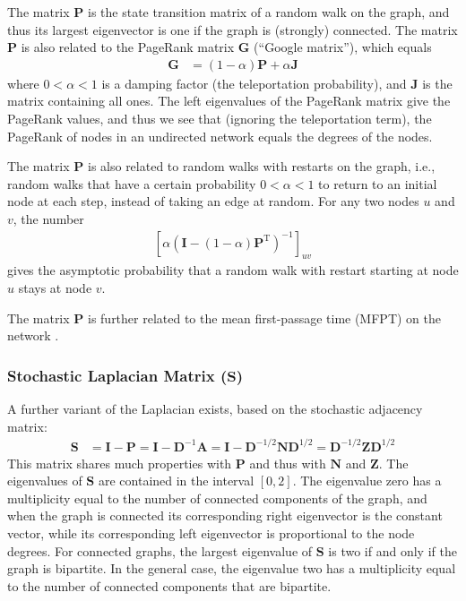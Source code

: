 \documentclass{article}
\begin{document}
The matrix $\mathbf P$ is the state transition matrix of a random walk
on the graph, and thus its largest eigenvector is one if the graph is
(strongly) connected.  
The matrix $\mathbf P$ is also related to the PageRank matrix $\mathbf
G$ (``Google matrix''), which
equals 
\begin{align*}
  \mathbf G &= (1-\alpha) \mathbf P + \alpha\mathbf J
\end{align*}
where $0 < \alpha < 1$ is a damping factor (the teleportation
probability), and $\mathbf J$ is the matrix containing all ones.  The
left 
eigenvalues of the PageRank matrix give the PageRank values, and thus
we see that (ignoring the teleportation term), the PageRank of nodes in
an undirected network equals the degrees of the nodes. 

The matrix $\mathbf P$ is also related to random walks with restarts on
the graph, i.e., random walks that have a certain probability $0 <
\alpha < 1$
to return to an initial node at each step, instead of taking an edge at
random.  For any two nodes $u$ and $v$, the number
\begin{align}
  \left[\alpha  (\mathbf I - (1-\alpha) \mathbf P^{\mathrm T})^{-1}\right]_{uv}
\end{align}
gives the asymptotic probability that a random walk with restart starting at node $u$
stays at node $v$.  

The matrix $\mathbf P$ is further related to the mean first-passage time
(MFPT) on the network \citep{b880}.

\subsubsection{Stochastic Laplacian Matrix ($\mathbf S$)}
A further variant of the Laplacian exists, based on the stochastic
adjacency matrix:
\begin{align*}
  \mathbf S &= \mathbf I - \mathbf P = \mathbf I - \mathbf D^{-1}
  \mathbf A = \mathbf I - \mathbf D^{-1/2} \mathbf N \mathbf D^{1/2} =
  \mathbf D^{-1/2} \mathbf Z \mathbf D^{1/2}
\end{align*}
This matrix shares much properties with $\mathbf P$ and thus with
$\mathbf N$ and $\mathbf Z$.  The eigenvalues of $\mathbf S$ are
contained in the interval $[0, 2]$.  The eigenvalue zero has a
multiplicity equal to the number of connected components of the graph,
and when the graph is connected its corresponding right eigenvector is the
constant vector, while its corresponding left eigenvector is
proportional to the node degrees.  For connected graphs, the largest
eigenvalue of $\mathbf S$ is two if and only if the graph is bipartite.
In the general case, the eigenvalue two has a multiplicity equal to the
number of connected components that are bipartite. 
\end{document}
